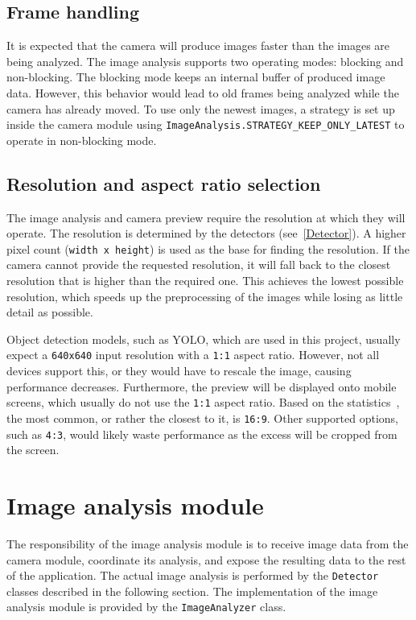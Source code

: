 \subsection{Frame handling}
It is expected that the camera will produce images faster than the images are being analyzed. The image analysis supports two operating modes: blocking and non-blocking. The blocking mode keeps an internal buffer of produced image data. However, this behavior would lead to old frames being analyzed while the camera has already moved. To use only the newest images, a strategy is set up inside the camera module using \texttt{ImageAnalysis.STRATEGY\_KEEP\_ONLY\_LATEST} to operate in non-blocking mode.

\subsection{Resolution and aspect ratio selection}
The image analysis and camera preview require the resolution at which they will operate. The resolution is determined by the detectors (see~\ref{Detector}). A higher pixel count (\texttt{width x height}) is used as the base for finding the resolution. If the camera cannot provide the requested resolution, it will fall back to the closest resolution that is higher than the required one. This achieves the lowest possible resolution, which speeds up the preprocessing of the images while losing as little detail as possible.

Object detection models, such as YOLO, which are used in this project, usually expect a \texttt{640x640} input resolution with a \texttt{1:1} aspect ratio. However, not all devices support this, or they would have to rescale the image, causing performance decreases. Furthermore, the preview will be displayed onto mobile screens, which usually do not use the \texttt{1:1} aspect ratio. Based on the statistics~\cite{aspectRatioStats}, the most common, or rather the closest to it, is \texttt{16:9}. Other supported options, such as \texttt{4:3}, would likely waste performance as the excess will be cropped from the screen.


\section{Image analysis module}
The responsibility of the image analysis module is to receive image data from the camera module, coordinate its analysis, and expose the resulting data to the rest of the application. The actual image analysis is performed by the \texttt{Detector} classes described in the following section. The implementation of the image analysis module is provided by the \texttt{ImageAnalyzer} class. 

